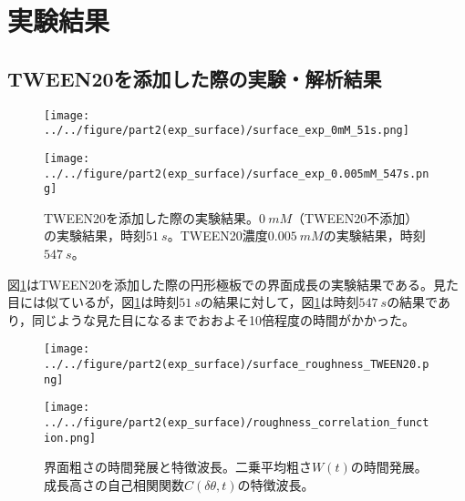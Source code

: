 \documentclass[autodetect-engine,dvi=dvipdfmx,a4paper,ja=standard,oneside,openany,11pt]{bxjsbook}
\begin{document}
\section{実験結果}
\subsection{TWEEN20を添加した際の実験・解析結果}
\begin{figure}[htbp]
  \begin{minipage}
    {0.5\textwidth}
    \subcaption{}
    \centering
    \texttt{[image: ../../figure/part2(exp\_surface)/surface\_exp\_0mM\_51s.png]}
    \label{fig:surface_exp_0mM_51s}
  \end{minipage}
  \begin{minipage}
    {0.5\textwidth}
    \subcaption{}
    \centering
    \texttt{[image: ../../figure/part2(exp\_surface)/surface\_exp\_0.005mM\_547s.png]}
    \label{fig:surface_exp_0.005mM_547s}
  \end{minipage}
  \caption{TWEEN20を添加した際の実験結果。$\SI{0}{mM}$（TWEEN20不添加）の実験結果，時刻$\SI{51}{s}$。TWEEN20濃度$\SI{0.005}{mM}$の実験結果，時刻$\SI{547}{s}$。}
  \label{fig:surface_exp}
\end{figure}
図\ref{fig:surface_exp}はTWEEN20を添加した際の円形極板での界面成長の実験結果である。見た目には似ているが，図\ref{fig:surface_exp}は時刻$\SI{51}{s}$の結果に対して，図\ref{fig:surface_exp}は時刻$\SI{547}{s}$の結果であり，同じような見た目になるまでおおよそ10倍程度の時間がかかった。

\begin{figure}[htbp]
  \begin{minipage}{0.43\textwidth}
    \subcaption{}
    \centering
    \texttt{[image: ../../figure/part2(exp\_surface)/surface\_roughness\_TWEEN20.png]}
    \label{fig:surface_roughness_TWEEN20}
  \end{minipage}
  \begin{minipage}{0.55\textwidth}
    \subcaption{}
    \centering
    \texttt{[image: ../../figure/part2(exp\_surface)/roughness\_correlation\_function.png]}
    \label{fig:roughness_correlation_function}
  \end{minipage}
  \caption{界面粗さの時間発展と特徴波長。二乗平均粗さ$W(t)$の時間発展。成長高さの自己相関関数$C(\delta\theta,t)$の特徴波長。}
  \label{fig:surface_roughness}
\end{figure}
\end{document}
